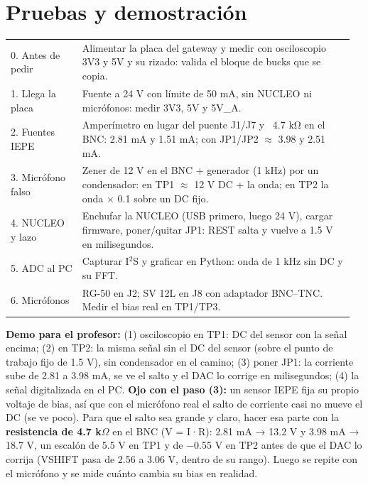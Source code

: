 \documentclass[10pt,a4paper]{article}
\begin{document}
\section{Pruebas y demostración}
\begin{longtable}{@{}L{0.2\linewidth}L{0.76\linewidth}@{}}. Antes de pedir & Alimentar la placa del gateway y medir con osciloscopio 3V3 y 5V y su rizado: valida el bloque de bucks que se copia.\\[2pt]
1. Llega la placa & Fuente a 24 V con límite de 50 mA, sin NUCLEO ni micrófonos: medir 3V3, 5V y 5V\_A.\\[2pt]
2. Fuentes IEPE & Amperímetro en lugar del puente J1/J7 y ~4.7 kΩ en el BNC: 2.81 mA y 1.51 mA; con JP1/JP2 \ensuremath{\approx} 3.98 y 2.51 mA.\\[2pt]
3. Micrófono falso & Zener de 12 V en el BNC + generador (1 kHz) por un condensador: en TP1 \ensuremath{\approx} 12 V DC + la onda; en TP2 la onda × 0.1 sobre un DC fijo.\\[2pt]
4. NUCLEO y lazo & Enchufar la NUCLEO (USB primero, luego 24 V), cargar firmware, poner/quitar JP1: REST salta y vuelve a 1.5 V en milisegundos.\\[2pt]
5. ADC al PC & Capturar I$^2$S y graficar en Python: onda de 1 kHz sin DC y su FFT.\\[2pt]
6. Micrófonos & RG-50 en J2; SV 12L en J8 con adaptador BNC–TNC. Medir el bias real en TP1/TP3.\\[2pt]
\bottomrule\end{longtable}
\textbf{Demo para el profesor:} (1) osciloscopio en TP1: DC del sensor con la señal encima; (2) en TP2: la
misma señal sin el DC del sensor (sobre el punto de trabajo fijo de 1.5 V), sin condensador en el camino;
(3) poner JP1: la corriente sube de 2.81 a 3.98 mA, se ve el salto y el DAC lo corrige en milisegundos;
(4) la señal digitalizada en el PC.
\textbf{Ojo con el paso (3):} un sensor IEPE fija su propio voltaje de bias, así que con el micrófono real
el salto de corriente casi no mueve el DC (se ve poco). Para que el salto sea grande y claro, hacer esa parte
con la \textbf{resistencia de 4.7 k$\Omega$} en el BNC (V = I·R): 2.81 mA → 13.2 V y 3.98 mA → 18.7 V, un
escalón de 5.5 V en TP1 y de −0.55 V en TP2 antes de que el DAC lo corrija (VSHIFT pasa de 2.56 a 3.06 V,
dentro de su rango). Luego se repite con el micrófono y se mide cuánto cambia su bias en realidad.
\end{document}
